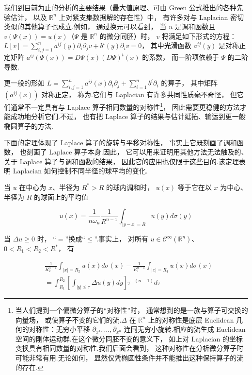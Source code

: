 我们到目前为止的分析的主要结果（最大值原理、可由 Green 公式推出的各种先验估计， 以及 $\mathbb{R}^{n}$ 上对紧支集数据解的存在性）中， 有许多对与 Laplacian 密切类似的其他算子也成立.例如， 通过换元可以看到， 当 $u$ 是调和函数且 $v(\Psi(x)) = u(x)$（$\Psi$ 是 $\mathbb{R}^{n}$ 的微分同胚）时， $v$ 将满足如下形式的方程：$L[v] = \sum_{i, j=1}^{n}a^{ij}(y)\partial_{i}\partial_{j}v + b^{i}(y)\partial_{i}v = 0$， 其中光滑函数 $a^{ij}(y)$ 是对称正定矩阵 $a^{ij}(\Psi(x)) = D\Psi(x)(D\Psi)^{t}(x)$ 的系数， 而一阶项依赖于 $\Psi$ 的二阶导数.

更一般的形如 $L = \sum_{i, j=1}^{n}a^{ij}(x)\partial_{i}\partial_{j} + \sum_{i=1}^{n}b^{i}\partial_{i}$ 的算子， 其中矩阵 $(a^{ij}(x))$ 对称正定， 称为.它们与 Laplacian 有许多共同性质毫不奇怪， 但它们通常不一定具有与 Laplace 算子相同数量的对称性\footnote{当人们提到一个偏微分算子的``对称性''时， 通常想到的是一族与算子可交换的向量场， 或使算子不变的它们的流.$\Delta$ 在 $\mathbb{R}^{n}$ 上的对称性是底层 Euclidean 几何的对称性：无穷小平移 $\partial_{x^{1}}, \ldots, \partial_{x^{n}}$ 连同无穷小旋转.相应的流生成 Euclidean 空间的刚体运动群.在这个微分同胚不变的意义下， 如上对 Laplacian 的坐标变换具有相同数量的对称性.我们后面会看到， 这种对称性在分析微分算子时可能非常有用.无论如何， 显然仅凭椭圆性条件并不能推出这种保持算子的流的存在.}， 因此需要更稳健的方法才能成功地分析它们.不过， 也有把 Laplace 算子的结果与估计延拓、输运到更一般椭圆算子的方法.

下面的定理体现了 Laplace 算子的旋转与平移对称性， 事实上它既刻画了调和函数， 也刻画了 Laplace 算子本身.因此， 它可以用来证明用其他方法无法触及的、关于 Laplace 算子与调和函数的结果， 因此它的应用也仅限于这些目的.该定理表明 Laplacian 如何控制不同半径的球平均的变化.

\begin{theorem}[平均值性质]\label{thm:c4-2.5}
当 $u$ 在中心为 $x$、半径为 $R^{*} > R$ 的球内调和时， $u(x)$ 等于它在以 $x$ 为中心、半径为 $R$ 的球面上的平均值

\[
u(x) = \frac{1}{n\omega_{n}}\frac{1}{R^{n-1}}\int_{|y-x|=R}u(y)d\sigma(y)
\]

当 $\Delta u \geq 0$ 时， ``$=$''换成``$\leq$''.事实上， 对所有 $u \in \mathcal{C}^{\infty}(\mathbb{R}^{n})$、$0 < R_{1} < R_{2} < R^{*}$， 有

\[
\begin{aligned}
&\frac{1}{R_{2}^{n-1}}\int_{|x|=R_{2}}u(x)d\sigma(x) - \frac{1}{R_{1}^{n-1}}\int_{|x|=R_{1}}u(x)d\sigma(x) \\
&= \int_{R_{1}}^{R_{2}}\left[\int_{|y|\leq\tau}\Delta u(y)dy\right]\tau^{-(n-1)}d\tau
\end{aligned}
\]
\end{theorem}

